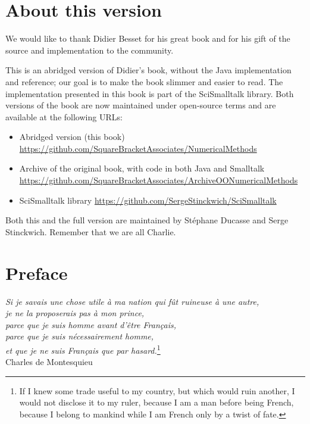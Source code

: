 \documentclass[twoside]{book}
\begin{document}
\fi


\chapter*{About this version}

We would like to thank Didier Besset for his great book and for his gift of the source and implementation to the community. 


This is an abridged version of Didier's book, without the Java implementation and reference; our goal is to make the book slimmer and easier to read.
The implementation presented in this book is part of the SciSmalltalk library.
Both versions of the book are now maintained under open-source terms and are available at the following URLs:

\begin{itemize}
\item Abridged version (this book)\\
  \url{https://github.com/SquareBracketAssociates/NumericalMethods}
\item Archive of the original book, with code in both Java and Smalltalk\\
  \url{https://github.com/SquareBracketAssociates/ArchiveOONumericalMethods}
\item SciSmalltalk library
  \url{https://github.com/SergeStinckwich/SciSmalltalk}
\end{itemize}

Both this and the full version are maintained by St\'ephane Ducasse and Serge Stinckwich.
Remember that we are all Charlie.

\bigskip
{}



\chapter*{Preface}

\begin{flushright} {\sl Si je savais une chose
utile \`{a} ma nation qui f\^{u}t ruineuse \`{a} une autre,\\je ne
la proposerais pas \`{a} mon prince,\\parce que je suis homme
avant d'\^etre Fran\c cais,\\parce que je suis n\'ecessairement
homme,\\et que je ne suis Fran\c cais que par hasard.}\footnote{If I
knew some trade useful to my country, but which would ruin
another, I would not disclose it to my ruler, because I am a man
before being French, because I belong to mankind while I am French
only by a twist of fate.}\\ Charles de Montesquieu
\end{flushright}
\end{document}
